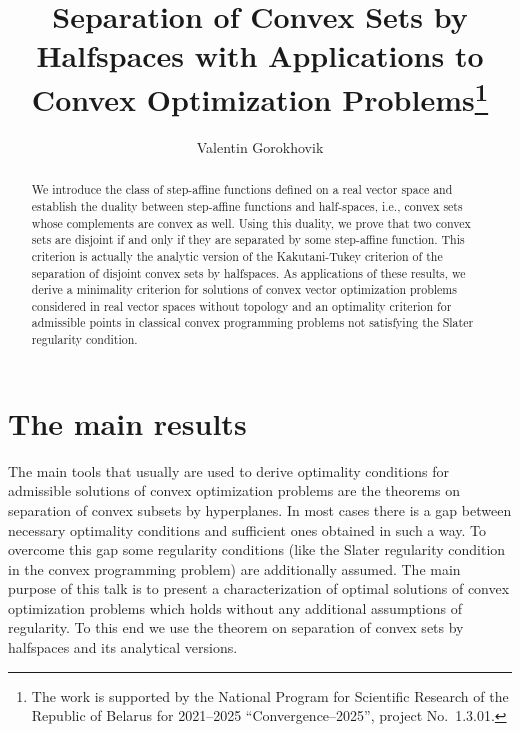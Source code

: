 \documentclass[12pt]{llncs}
\begin{document}
\fi

\title{Separation of Convex Sets by Halfspaces with Applications to Convex Optimization Problems\thanks{The work is supported by the National Program for Scientific Research of
the Republic of Belarus for 2021--2025 ``Convergence--2025'', project No.~1.3.01.}}
\author{Valentin Gorokhovik }
  

  
\maketitle

\begin{abstract}
We introduce the class of step-affine functions defined on a real vector space and establish the duality
between step-affine functions and half-spaces, i.e., convex sets whose complements are convex as well. Using
this duality, we prove that two convex sets are disjoint if and only if they are separated by some step-affine
function. This criterion is actually the analytic version of the Kakutani-Tukey criterion of the separation of
disjoint convex sets by halfspaces. As applications of these results, we derive a minimality criterion for solutions
of convex vector optimization problems considered in real vector spaces without topology and an optimality
criterion for admissible points in classical convex programming problems not satisfying the Slater regularity
condition.

\end{abstract}

\section{The main results}

The main tools that usually are used to derive optimality
conditions for admissible solutions of convex optimization
problems are the theorems on separation of convex subsets by
hyper\-pla\-nes. In most cases there is a gap between necessary
optimality conditions and sufficient ones obtained in such a way.
To overcome this gap some regularity conditions (like the Slater
regularity condition in the convex programming problem) are
additionally assumed. The main purpose of this talk is to present
a characterization of optimal solutions of convex optimization
problems which holds without any additional assumptions of
regularity. To this end we use the theorem on separation of convex
sets by halfspaces and its analytical versions.
\end{document}
